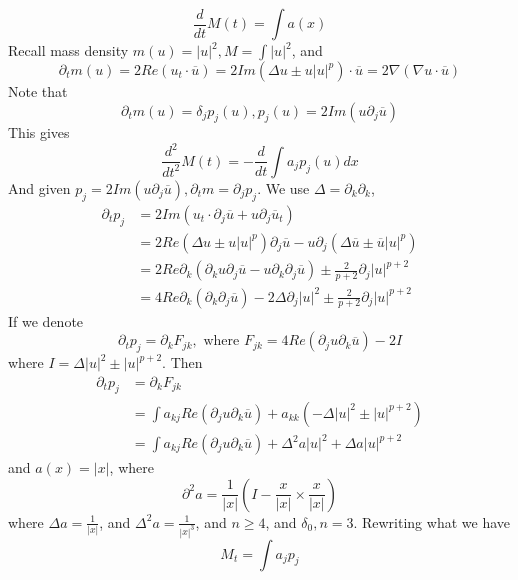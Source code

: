\begin{equation*}
    \frac{d}{dt}M(t)=\int a(x)
\end{equation*}
Recall mass density $m(u)=|u|^2, M=\int |u|^2$, and 
\begin{equation*}
    \partial_tm(u)=2Re(u_t\cdot\overline{u})=2Im(\Delta u\pm u|u|^p)\cdot\overline{u}=2\nabla(\nabla u\cdot\overline{u})
\end{equation*}
Note that 
\begin{equation*}
    \partial_tm(u)=\delta_jp_j(u), p_j(u)=2Im(u\partial_j\overline{u})
\end{equation*}
This gives 
\begin{equation*}
    \frac{d^2}{dt^2}M(t)=-\frac{d}{dt}\int a_jp_j(u)dx
\end{equation*}
And given $p_j=2Im(u\partial_j\overline{u}), \partial_tm=\partial_jp_j$. We use $\Delta=\partial_k\partial_k$,
\begin{align*}
    \partial_tp_j&=2Im(u_t\cdot\partial_j\overline{u}+u\partial_j\overline{u}_t)\\
    &=2Re(\Delta u\pm u|u|^p)\partial_j\overline{u}-u\partial_j(\Delta\overline{u}\pm\overline{u}|u|^p)\\
    &=2Re\partial_k(\partial_k u\partial_j\overline{u}-u\partial_k\partial_j\overline{u})\pm\frac{2}{p+2}\partial_j|u|^{p+2}\\
    &=4 Re\partial_k(\partial_k\partial_j\overline{u})-2\Delta\partial_j|u|^2\pm\frac{2}{p+2}\partial_j|u|^{p+2}
\end{align*}
If we denote 
\begin{equation*}
    \partial_tp_j=\partial_kF_{jk}, \text{ where }F_{jk}=4Re(\partial_ju\partial_k\overline{u})-2I 
\end{equation*}
where $I=\Delta|u|^2\pm |u|^{p+2}$.
Then 
\begin{align*}
    \partial_tp_j&=\partial_kF_{jk}\\
    &=\int a_{kj}Re(\partial_j u\partial_k\overline{u})+a_{kk}(-\Delta|u|^2\pm |u|^{p+2})\\
    &=\int a_{kj}Re(\partial_j u\partial_k\overline{u})+\Delta^2 a|u|^2+\Delta a|u|^{p+2}
\end{align*}
and $a(x)=|x|$, where 
\begin{equation*}
    \partial^2a=\frac{1}{|x|}(I-\frac{x}{|x|}\times\frac{x}{|x|})
\end{equation*}
where $\Delta a=\frac{1}{|x|}$, and $\Delta^2a=\frac{1}{|x|^3}$, and $n\geq 4$, and $\delta_0, n=3$. Rewriting what we have 
\begin{equation*}
    M_t=\int a_jp_j
\end{equation*}
